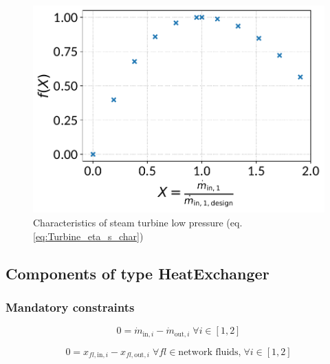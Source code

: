 \begin{minipage}{0.5\textwidth}
\begin{figure}[H]\begin{center}
\includegraphics[width=\textwidth]{figures/Turbine_CharLine_eta_s_char_steam_turbine_low_pressure.pdf}
\caption{Characteristics of steam turbine low pressure (eq. \ref{eq:Turbine_eta_s_char})}
\label{fig:CharLine_eta_s_char_steam turbine low pressure}
\end{center}\end{figure}

\end{minipage}

\subsection{Components of type HeatExchanger}

\subsubsection{Mandatory constraints}

\begin{equation}
\label{eq:HeatExchanger_mass_flow_constraints}
0=\dot{m}_{\mathrm{in,}i}-\dot{m}_{\mathrm{out,}i}\; \forall i \in [1, 2]
\end{equation}

\begin{equation}
\label{eq:HeatExchanger_fluid_constraints}
0=x_{fl\mathrm{,in,}i}-x_{fl\mathrm{,out,}i}\;\forall fl \in\text{network fluids,}\; \forall i \in [1, 2]
\end{equation}

